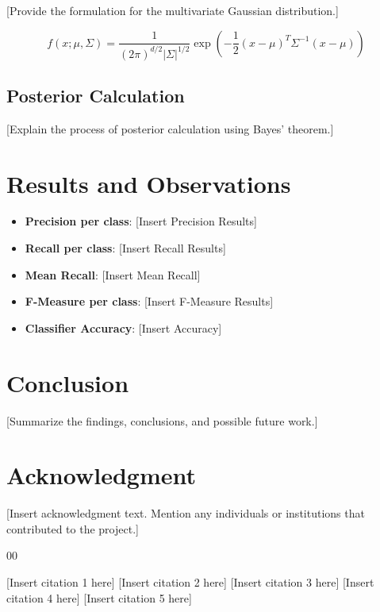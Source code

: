 \documentclass[conference]{IEEEtran}
\begin{document}
	[Provide the formulation for the multivariate Gaussian distribution.]
	
	\[
	f(x; \mu, \Sigma) = \frac{1}{(2\pi)^{d/2} |\Sigma|^{1/2}} \exp\left(-\frac{1}{2} (x - \mu)^T \Sigma^{-1} (x - \mu)\right)
	\]
	
	\subsection{Posterior Calculation}
	
	[Explain the process of posterior calculation using Bayes' theorem.]
	
	\section{Results and Observations}
	
	\begin{itemize}
		\item \textbf{Precision per class}: [Insert Precision Results]
		\item \textbf{Recall per class}: [Insert Recall Results]
		\item \textbf{Mean Recall}: [Insert Mean Recall]
		\item \textbf{F-Measure per class}: [Insert F-Measure Results]
		\item \textbf{Classifier Accuracy}: [Insert Accuracy]
	\end{itemize}
	
	
	\section{Conclusion}
	
	[Summarize the findings, conclusions, and possible future work.]
	
	\section*{Acknowledgment}
	
	[Insert acknowledgment text. Mention any individuals or institutions that contributed to the project.]
	
	\begin{thebibliography}{00}
		
		 [Insert citation 1 here]
		 [Insert citation 2 here]
		 [Insert citation 3 here]
		 [Insert citation 4 here]
		 [Insert citation 5 here]
		
	\end{thebibliography}
	
\end{document}
